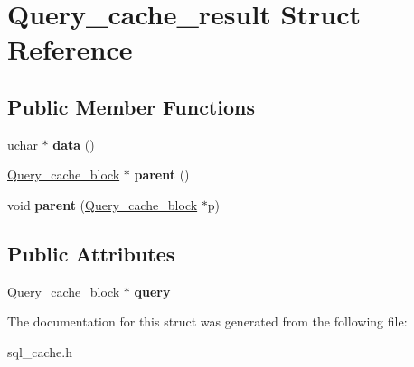\hypertarget{structQuery__cache__result}{}\section{Query\+\_\+cache\+\_\+result Struct Reference}
\label{structQuery__cache__result}
\subsection*{Public Member Functions}
\begin{DoxyCompactItemize}
\item 
\mbox{\label{structQuery__cache__result_a180855a5cf81e3e7139e8cad4ab21ed3}} 
uchar $\ast$ {\bfseries data} ()
\item 
\mbox{\label{structQuery__cache__result_af9198f6f6eeed46c9846fd9072a5004c}} 
\mbox{\hyperlink{structQuery__cache__block}{Query\+\_\+cache\+\_\+block}} $\ast$ {\bfseries parent} ()
\item 
\mbox{\label{structQuery__cache__result_a2b6ce65e1ecb6d288660a61cda91a582}} 
void {\bfseries parent} (\mbox{\hyperlink{structQuery__cache__block}{Query\+\_\+cache\+\_\+block}} $\ast$p)
\end{DoxyCompactItemize}
\subsection*{Public Attributes}
\begin{DoxyCompactItemize}
\item 
\mbox{\label{structQuery__cache__result_a817d9838858bfd3de8cdcc33f3403f01}} 
\mbox{\hyperlink{structQuery__cache__block}{Query\+\_\+cache\+\_\+block}} $\ast$ {\bfseries query}
\end{DoxyCompactItemize}


The documentation for this struct was generated from the following file\+:\begin{DoxyCompactItemize}
\item 
sql\+\_\+cache.\+h\end{DoxyCompactItemize}
